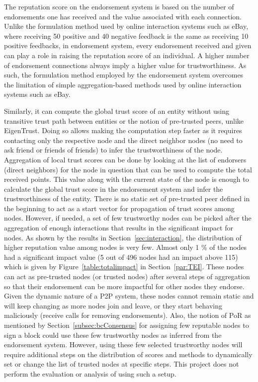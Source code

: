 The reputation score on the endorsement system is based on the number of
endorsements one has received and the value associated with each connection.
Unlike the formulation method used by online interaction systems such as eBay,
where receiving 50 positive and 40 negative feedback is the same as receiving
10 positive feedbacks, in endorsement system, every endorsement received and
given can play a role in raising the reputation score of an individual. A
higher number of endorsement connections always imply a higher value for
trustworthiness. As such, the formulation method employed by the endorsement
system overcomes the limitation of simple aggregation-based methods used by
online interaction systems such as eBay. \par

Similarly, it can compute the global trust score of an entity without using
transitive trust path between entities or the notion of pre-trusted peers,
unlike EigenTrust. Doing so allows making the computation step faster as it
requires contacting only the respective node and the direct neighbor nodes (no
need to ask friend or friends of friends) to infer the trustworthiness of the
node. Aggregation of local trust scores can be done by looking at the list of
endorsers (direct neighbors) for the node in question that can be used to
compute the total received points. This value along with the current state of
the node is enough to calculate the global trust score in the endorsement
system and infer the trustworthiness of the entity. There is no static set of
pre-trusted peer defined in the beginning to act as a start vector for
propagation of trust scores among nodes. However, if needed, a set of few
trustworthy nodes can be picked after the aggregation of enough interactions
that results in the significant impact for nodes. As shown by the results in
Section~\ref{sec:interaction}, the distribution of higher reputation value
among nodes is very few. Almost only 1 \% of the nodes had a significant impact
value (5 out of 496 nodes had an impact above 115) which is given by
Figure~\ref{table:totalimpact} in Section~\ref{par:TEI}. These nodes can act as
pre-trusted nodes (or trusted nodes) after several steps of aggregation so that
their endorsement can be more impactful for other nodes they endorse. Given the
dynamic nature of a P2P system, these nodes cannot remain static and will keep
changing as more nodes join and leave, or they start behaving maliciously
(receive calls for removing endorsements). Also, the notion of \ac{PoR} as
mentioned by Section~\ref{subsec:bcConsensus} for assigning few reputable nodes
to sign a block could use these few trustworthy nodes as inferred from the
endorsement system. However, using these few selected trustworthy nodes will
require additional steps on the distribution of scores and methods to
dynamically set or change the list of trusted nodes at specific steps. This
project does not perform the evaluation or analysis of using such a setup. \par

